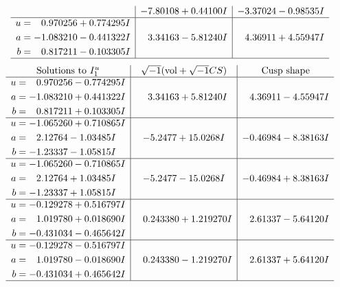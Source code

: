\documentclass[1p]{elsarticle_modified}
\theoremstyle{definition}
\newcommand{\I}{\sqrt{-1}}
\begin{document}
$$\begin{array}{c|c|c}
 & -7.80108 + 0.44100 I & -3.37024 - 0.98535 I \\ \hline\begin{aligned}
u &= \phantom{-}0.970256 + 0.774295 I \\
a &= -1.083210 - 0.441322 I \\
b &= \phantom{-}0.817211 - 0.103305 I\end{aligned}
 & \phantom{-}3.34163 - 5.81240 I & \phantom{-}4.36911 + 4.55947 I\\
 \hline 
 \end{array}$$\newpage$$\begin{array}{c|c|c}  
\text{Solutions to }I^u_{1}& \I (\text{vol} + \sqrt{-1}CS) & \text{Cusp shape}\\
 \hline 
\begin{aligned}
u &= \phantom{-}0.970256 - 0.774295 I \\
a &= -1.083210 + 0.441322 I \\
b &= \phantom{-}0.817211 + 0.103305 I\end{aligned}
 & \phantom{-}3.34163 + 5.81240 I & \phantom{-}4.36911 - 4.55947 I \\ \hline\begin{aligned}
u &= -1.065260 + 0.710865 I \\
a &= \phantom{-}2.12764 - 1.03485 I \\
b &= -1.23337 - 1.05815 I\end{aligned}
 & -5.2477 + 15.0268 I & -0.46984 - 8.38163 I \\ \hline\begin{aligned}
u &= -1.065260 - 0.710865 I \\
a &= \phantom{-}2.12764 + 1.03485 I \\
b &= -1.23337 + 1.05815 I\end{aligned}
 & -5.2477 - 15.0268 I & -0.46984 + 8.38163 I \\ \hline\begin{aligned}
u &= -0.129278 + 0.516797 I \\
a &= \phantom{-}1.019780 + 0.018690 I \\
b &= -0.431034 - 0.465642 I\end{aligned}
 & \phantom{-}0.243380 + 1.219270 I & \phantom{-}2.61337 - 5.64120 I \\ \hline\begin{aligned}
u &= -0.129278 - 0.516797 I \\
a &= \phantom{-}1.019780 - 0.018690 I \\
b &= -0.431034 + 0.465642 I\end{aligned}
 & \phantom{-}0.243380 - 1.219270 I & \phantom{-}2.61337 + 5.64120 I\\
 \hline 
 \end{array}$$\newpage\newpage\renewcommand{\arraystretch}{1}
\end{document}
